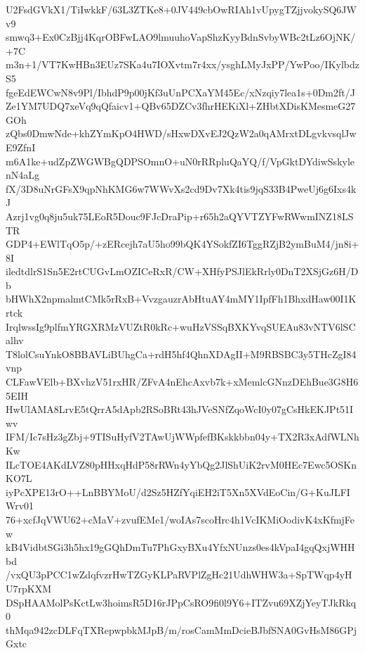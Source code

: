 U2FsdGVkX1/TiIwkkF/63L3ZTKe8+0JV449cbOwRIAh1vUpygTZjjvokySQ6JWv9
smwq3+Ex0CzBjj4KqrOBFwLAO9lmuuhoVapShzKyyBdnSvbyWBc2tLz6OjNK/+7C
m3n+1/VT7KwHBn3EUz7SKa4u7IOXvtm7r4xx/ysghLMyJxPP/YwPoo/IKylbdzS5
fgeEdEWCwN8v9Pl/IbhdP9p00jKf3uUnPCXaYM45Ec/xNzqiy7lea1s+0Dm2ft/J
Ze1YM7UDQ7xeVq9qQfaicv1+QBv65DZCv3fhrHEKiXl+ZHbtXDisKMesmeG27GOh
zQbs0DmwNde+khZYmKpO4HWD/sHxwDXvEJ2QzW2a0qAMrxtDLgvkvsqlJwE9ZfnI
m6A1ke+udZpZWGWBgQDPSOmnO+uN0rRRpluQaYQ/f/VpGktDYdiwSskylenN4aLg
fX/3D8uNrGFsX9qpNhKMG6w7WWvXs2cd9Dv7Xk4tis9jqS33B4PweUj6g6Ixs4kJ
Azrj1vg0q8ju5uk75LEoR5Douc9FJcDraPip+r65h2aQYVTZYFwRWwmINZ18LSTR
GDP4+EWlTqO5p/+zERcejh7aU5ho99bQK4YSokfZI6TggRZjB2ymBuM4/jn8i+8I
iledtdlrS1Sn5E2rtCUGvLmOZICeRxR/CW+XHfyPSJlEkRrly0DnT2XSjGz6H/Db
bHWhX2npmalmtCMk5rRxB+VvzgauzrAbHtuAY4mMY1IpfFh1BhxdHaw00I1Krtck
IrqlwssIg9plfmYRGXRMzVUZtR0kRc+wuHzVSSqBXKYvqSUEAu83vNTV6lSCalhv
T8lolCsuYnkO8BBAVLiBUhgCa+rdH5hf4QhnXDAgII+M9RBSBC3y5THcZgI84vnp
CLFawVElb+BXvhzV51rxHR/ZFvA4nEhcAxvb7k+xMemlcGNnzDEhBue3G8H65EIH
HwUlAMA8LrvE5tQrrA5dApb2RSoBRt43hJVeSNfZqoWcI0y07gCsHkEKJPt51Iwv
IFM/Ic7sHz3gZbj+9TISuHyfV2TAwUjWWpfefBKskkbbn04y+TX2R3xAdfWLNhKw
ILcTOE4AKdLVZ80pHHxqHdP58rRWn4yYbQg2JlShUiK2rvM0HEc7Ewc5OSKnKO7L
iyPcXPE13rO++LnBBYMoU/d2Sz5HZfYqiEH2iT5Xn5XVdEoCin/G+KuJLFIWrv01
76+xcfJqVWU62+cMaV+zvufEMe1/woIAs7scoHrc4h1VcIKMiOodivK4xKfmjFew
kB4VidbtSGi3h5hx19gGQhDmTu7PhGxyBXu4YfxNUnzs0es4kVpaI4gqQxjWHHbd
/vxQU3pPCC1wZdqfvzrHwTZGyKLPaRVPlZgHc21UdhWHW3a+SpTWqp4yHU7rpKXM
DSpHAAMolPsKctLw3hoimsR5D16rJPpCsRO9fi0l9Y6+ITZvu69XZjYeyTJkRkq0
thMqa942zcDLFqTXRepwpbkMJpB/m/rosCamMmDcieBJbfSNA0GvHsM86GPjGxtc
